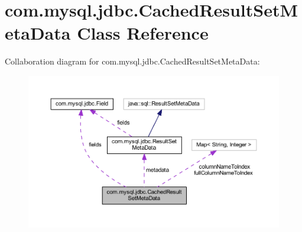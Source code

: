 \hypertarget{classcom_1_1mysql_1_1jdbc_1_1_cached_result_set_meta_data}{}\section{com.\+mysql.\+jdbc.\+Cached\+Result\+Set\+Meta\+Data Class Reference}
\label{classcom_1_1mysql_1_1jdbc_1_1_cached_result_set_meta_data}


Collaboration diagram for com.\+mysql.\+jdbc.\+Cached\+Result\+Set\+Meta\+Data\+:\nopagebreak
\begin{figure}[H]
\begin{center}
\leavevmode
\includegraphics[width=350pt]{classcom_1_1mysql_1_1jdbc_1_1_cached_result_set_meta_data__coll__graph}
\end{center}
\end{figure}
